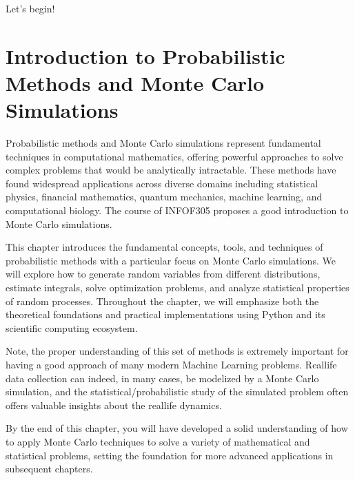 \documentclass[letterpaper,10pt,english]{jupyterBook}
\begin{document}
\sphinxAtStartPar
{}

\sphinxAtStartPar
Let’s begin!

\sphinxstepscope


\chapter{Introduction to Probabilistic Methods and Monte Carlo Simulations}
\label{\detokenize{01:introduction-to-probabilistic-methods-and-monte-carlo-simulations}}\label{\detokenize{01::doc}}
\sphinxAtStartPar
Probabilistic methods and Monte Carlo simulations represent fundamental techniques in computational mathematics, offering powerful approaches to solve complex problems that would be analytically intractable. These methods have found widespread applications across diverse domains including statistical physics, financial mathematics, quantum mechanics, machine learning, and computational biology. The course of INFO\sphinxhyphen{}F305 \sphinxhyphen{}  proposes a good introduction to Monte Carlo simulations.

\sphinxAtStartPar
This chapter introduces the fundamental concepts, tools, and techniques of probabilistic methods with a particular focus on Monte Carlo simulations. We will explore how to generate random variables from different distributions, estimate integrals, solve optimization problems, and analyze statistical properties of random processes. Throughout the chapter, we will emphasize both the theoretical foundations and practical implementations using Python and its scientific computing ecosystem.

\sphinxAtStartPar
Note, the proper understanding of this set of methods is extremely important for having a good approach of many modern Machine Learning problems. Real\sphinxhyphen{}life data collection can indeed, in many cases, be modelized by a Monte Carlo simulation, and the statistical/probabilistic study of the simulated problem often offers valuable insights about the real\sphinxhyphen{}life dynamics.

\sphinxAtStartPar
By the end of this chapter, you will have developed a solid understanding of how to apply Monte Carlo techniques to solve a variety of mathematical and statistical problems, setting the foundation for more advanced applications in subsequent chapters.
\end{document}

